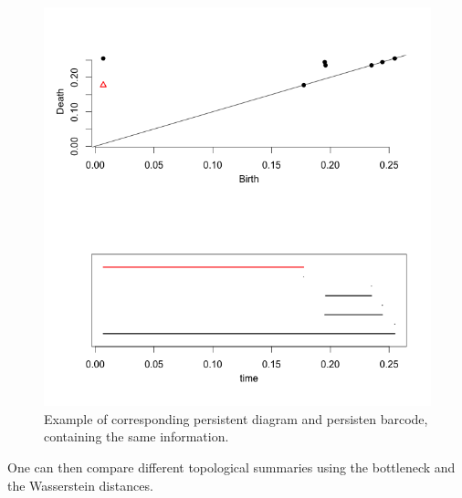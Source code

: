 \documentclass[12pt,a4paper]{article}
\begin{document}
\begin{figure}[hbtp]
\centering
\includegraphics[scale=0.75]{rplot01.png}
\caption{Example of corresponding persistent diagram and persisten barcode, containing the same information.}
\label{fig:bc_pd}
\end{figure}
One can then compare different topological summaries using the bottleneck and the Wasserstein distances.
\end{document}

